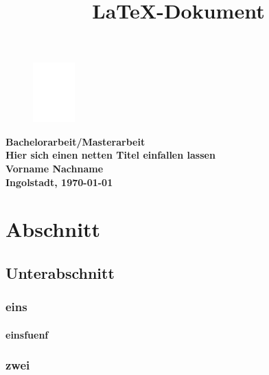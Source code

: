 \documentclass[a4paper,11pt,DIV=11]{scrreprt}
\begin{document}
\begin{titlepage}
\title{\LaTeX{}-Dokument}

\begin{figure}[h!] %
	\centering
	\includegraphics[height=2.3cm]{images/thi_FEI_logo.eps}
\end{figure}

\vspace{1cm}
	
\begin{center}
\textbf{
	{\large Bachelorarbeit/Masterarbeit} \\[3ex]
	{\LARGE Hier sich einen netten Titel einfallen lassen} \\[8ex]
	Vorname Nachname \\[5ex]
}
\blindtext
\textbf{
	\vfill Ingolstadt, \today
}
\end{center}

\end{titlepage}

\tableofcontents

\chapter{Abschnitt}
\section{Unterabschnitt}
\subsection{eins}
\subsubsection{einsfuenf}
\subsection{zwei}
\end{document}
